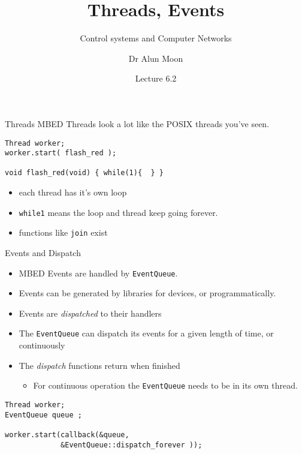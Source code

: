 \documentclass[xcolor=svgnames]{beamer}
\title{Threads, Events}
\subtitle{Control systems and Computer Networks}
\author{Dr Alun Moon}
\date{Lecture 6.2}
\begin{document}
\frame{\maketitle}

\begin{frame}[fragile]{Threads}
   MBED Threads look a lot like the POSIX threads you've seen.
\begin{tcolorbox}
\begin{verbatim}
Thread worker;
worker.start( flash_red );

void flash_red(void) { while(1){  } }
\end{verbatim}
\end{tcolorbox}
\begin{itemize}
    \item each thread has it's own loop
    \item \texttt{while{1}} means the loop and thread keep going forever.
    \item functions like \texttt{join} exist
\end{itemize}
\end{frame}

\begin{frame}[fragile]{Events and Dispatch}
\begin{itemize}
    \item MBED Events are handled by \texttt{EventQueue}.
    \item Events can be generated by libraries for devices, or programmatically.
    \item Events are \emph{dispatched} to their handlers
    \item The \texttt{EventQueue} can dispatch its events for a given length of time, or continuously
    \item The \emph{dispatch} functions return when finished
    \begin{itemize}
        \item For continuous operation the \texttt{EventQueue} needs to be in its own thread.
    \end{itemize}
\end{itemize}
\begin{tcolorbox}
\begin{verbatim}
Thread worker;
EventQueue queue ;

worker.start(callback(&queue,
             &EventQueue::dispatch_forever ));
\end{verbatim}
\end{tcolorbox}

\end{frame}
\end{document}
